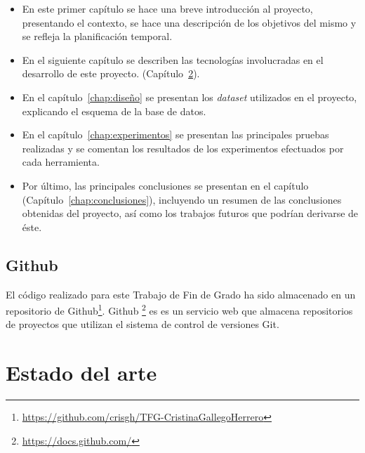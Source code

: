 \documentclass[a4paper, 12pt]{book}
\begin{document}
    \begin{itemize}
      \item En este primer capítulo se hace una breve introducción al proyecto, presentando el contexto, se hace una descripción de los objetivos del mismo y se refleja la planificación temporal.
      \item En el siguiente capítulo se describen las tecnologías involucradas en el desarrollo de este proyecto. (Capítulo~\ref{chap:tecnologias}).
      \item En el capítulo~\ref{chap:diseño} se presentan los \textit{dataset} utilizados en el proyecto, explicando el esquema de la base de datos. 
      \item En el capítulo~\ref{chap:experimentos} se presentan las principales pruebas realizadas y se comentan los resultados de los experimentos
      efectuados por cada herramienta. 
      \item Por último, las principales conclusiones se presentan en el capítulo (Capítulo~\ref{chap:conclusiones}), incluyendo un resumen de las conclusiones obtenidas del proyecto, así como los trabajos futuros que podrían derivarse de éste.
    \end{itemize}


\section{Github}
\label{sec:github}

El código realizado para este Trabajo de Fin de Grado ha sido almacenado en un repositorio de Github\footnote{\url{https://github.com/crisgh/TFG-CristinaGallegoHerrero}}. Github \footnote{\url{https://docs.github.com/}} es es un servicio web que almacena repositorios de proyectos que utilizan el sistema de control de versiones Git.


\clearpage


\chapter{Estado del arte}               %
\label{chap:tecnologias}
\end{document}
